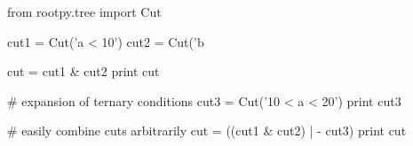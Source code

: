 \begin{footnotesize}
\begin{pyglist}[language=python,texcl=true,style=vs,bgcolor=Moccasin]
from rootpy.tree import Cut

cut1 = Cut('a < 10')
cut2 = Cut('b %

cut = cut1 & cut2
print cut

# expansion of ternary conditions
cut3 = Cut('10 < a < 20')
print cut3

# easily combine cuts arbitrarily
cut = ((cut1 & cut2) | - cut3)
print cut
\end{pyglist}
\end{footnotesize}
